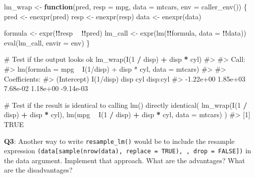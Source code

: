 \documentclass[
]{krantz}
\makeatletter
\newenvironment{Shaded}{\begin{snugshade}}{\end{snugshade}}
\newcommand{\CommentTok}[1]{\textcolor[rgb]{0.56,0.35,0.01}{\textit{#1}}}
\newcommand{\ControlFlowTok}[1]{\textcolor[rgb]{0.13,0.29,0.53}{\textbf{#1}}}
\newcommand{\DataTypeTok}[1]{\textcolor[rgb]{0.13,0.29,0.53}{#1}}
\newcommand{\DecValTok}[1]{\textcolor[rgb]{0.00,0.00,0.81}{#1}}
\newcommand{\KeywordTok}[1]{\textcolor[rgb]{0.13,0.29,0.53}{\textbf{#1}}}
\newcommand{\NormalTok}[1]{#1}
\newcommand{\OperatorTok}[1]{\textcolor[rgb]{0.81,0.36,0.00}{\textbf{#1}}}
\newcommand{\StringTok}[1]{\textcolor[rgb]{0.31,0.60,0.02}{#1}}
\newenvironment{kframe}{%
\medskip{}
\setlength{\fboxsep}{.8em}
 \def\at@end@of@kframe{}%
 \ifinner\ifhmode%
  \def\at@end@of@kframe{\end{minipage}}%
  \begin{minipage}{\columnwidth}%
 \fi\fi%
 \def\FrameCommand##1{\hskip\@totalleftmargin \hskip-\fboxsep
 \colorbox{shadecolor}{##1}\hskip-\fboxsep
     \hskip-\linewidth \hskip-\@totalleftmargin \hskip\columnwidth}%
 \MakeFramed {\advance\hsize-\width
   \@totalleftmargin\z@ \linewidth\hsize
   \@setminipage}}%
 {\par\unskip\endMakeFramed%
 \at@end@of@kframe}
\renewenvironment{Shaded}{\begin{kframe}}{\end{kframe}}
\renewcommand{\KeywordTok} [1]{\textcolor[rgb]{0.00,0.44,0.13}{{#1}}}
\renewcommand{\DataTypeTok}[1]{\textcolor[rgb]{0.56,0.13,0.00}{{#1}}}
\renewcommand{\DecValTok}  [1]{\textcolor[rgb]{0.25,0.63,0.44}{{#1}}}
\renewcommand{\StringTok}  [1]{\textcolor[rgb]{0.25,0.44,0.63}{{#1}}}
\renewcommand{\CommentTok} [1]{\textcolor[rgb]{0.38,0.63,0.69}{{#1}}}
\renewcommand{\NormalTok}  [1]{{#1}}
\makeatother
\begin{document}
\begin{Shaded}
\begin{Highlighting}[]
\NormalTok{lm_wrap <-}\StringTok{ }\ControlFlowTok{function}\NormalTok{(pred, }\DataTypeTok{resp =}\NormalTok{ mpg, }\DataTypeTok{data =}\NormalTok{ mtcars, }
                    \DataTypeTok{env =} \KeywordTok{caller_env}\NormalTok{()) \{}
\NormalTok{  pred <-}\StringTok{ }\KeywordTok{enexpr}\NormalTok{(pred)}
\NormalTok{  resp <-}\StringTok{ }\KeywordTok{enexpr}\NormalTok{(resp)}
\NormalTok{  data <-}\StringTok{ }\KeywordTok{enexpr}\NormalTok{(data)}
  
\NormalTok{  formula <-}\StringTok{ }\KeywordTok{expr}\NormalTok{(}\OperatorTok{!!}\NormalTok{resp }\OperatorTok{~}\StringTok{ }\OperatorTok{!!}\NormalTok{pred)}
\NormalTok{  lm_call <-}\StringTok{ }\KeywordTok{expr}\NormalTok{(}\KeywordTok{lm}\NormalTok{(}\OperatorTok{!!}\NormalTok{formula, }\DataTypeTok{data =} \OperatorTok{!!}\NormalTok{data))}
  \KeywordTok{eval}\NormalTok{(lm_call, }\DataTypeTok{envir =}\NormalTok{ env)}
\NormalTok{\}}

\CommentTok{# Test if the output looks ok}
\KeywordTok{lm_wrap}\NormalTok{(}\KeywordTok{I}\NormalTok{(}\DecValTok{1} \OperatorTok{/}\StringTok{ }\NormalTok{disp) }\OperatorTok{+}\StringTok{ }\NormalTok{disp }\OperatorTok{*}\StringTok{ }\NormalTok{cyl)}
\CommentTok{#> }
\CommentTok{#> Call:}
\CommentTok{#> lm(formula = mpg ~ I(1/disp) + disp * cyl, data = mtcars)}
\CommentTok{#> }
\CommentTok{#> Coefficients:}
\CommentTok{#> (Intercept)    I(1/disp)         disp          cyl     disp:cyl  }
\CommentTok{#>   -1.22e+00     1.85e+03     7.68e-02     1.18e+00    -9.14e-03}

\CommentTok{# Test if the result is identical to calling lm() directly}
\KeywordTok{identical}\NormalTok{(}
  \KeywordTok{lm_wrap}\NormalTok{(}\KeywordTok{I}\NormalTok{(}\DecValTok{1} \OperatorTok{/}\StringTok{ }\NormalTok{disp) }\OperatorTok{+}\StringTok{ }\NormalTok{disp }\OperatorTok{*}\StringTok{ }\NormalTok{cyl),}
  \KeywordTok{lm}\NormalTok{(mpg }\OperatorTok{~}\StringTok{ }\KeywordTok{I}\NormalTok{(}\DecValTok{1} \OperatorTok{/}\StringTok{ }\NormalTok{disp) }\OperatorTok{+}\StringTok{ }\NormalTok{disp }\OperatorTok{*}\StringTok{ }\NormalTok{cyl, }\DataTypeTok{data =}\NormalTok{ mtcars)}
\NormalTok{)}
\CommentTok{#> [1] TRUE}
\end{Highlighting}
\end{Shaded}

\textbf{{Q3}}: Another way to write \texttt{resample\_lm()} would be to include the resample expression \texttt{(data{[}sample(nrow(data),\ replace\ =\ TRUE),\ ,\ drop\ =\ FALSE{]})} in the data argument. Implement that approach. What are the advantages? What are the disadvantages?
\end{document}
